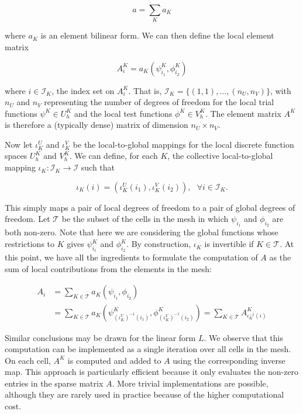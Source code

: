 \begin{equation}
a = \sum_{K} a_K
\end{equation}

where $a_K$ is an element bilinear form. We can then define the local element matrix

\begin{equation}
A_i^K = a_K (\psi_{i_1}^K, \phi_{i_2}^K)
\end{equation}

where $i \in \mathcal{I}_K$, the index set on $A_i^K$. That is, $\mathcal{I}_K = \lbrace (1,1), ..., (n_U, n_V) \rbrace$, with $n_U$ and $n_V$ representing the number of degrees of freedom for the local trial functions $\psi^K \in U_h^K$ and the local test functions $\phi^K \in V_h^K$. The element matrix $A^K$ is therefore a (typically dense) matrix of dimension $n_U \times n_V$.

Now let $\iota_K^U$ and $\iota_K^V$ be the local-to-global mappings for the local discrete function spaces $U_h^K$ and $V_h^K$. We can define, for each $K$, the collective local-to-global mapping $\iota_K : \mathcal{I}_K \rightarrow \mathcal{I}$ such that

\begin{equation}
\iota_K (i) = (\iota_K^U(i_1), \iota_K^V(i_2)),\ \ \ \forall i \in \mathcal{I}_K.
\end{equation}

This simply maps a pair of local degrees of freedom to a pair of global degrees of freedom. Let $\mathcal{T}$ be the subset of the cells in the mesh in which $\psi_{i_1}$ and $\phi_{i_2}$ are both non-zero. Note that here we are considering the global functions whose restrictions to $K$ gives $\psi_{i_1}^K$ and $\phi_{i_2}^K$. By construction, $\iota_K$ is invertible if $K \in \mathcal{T}$. At this point, we have all the ingredients to formulate the computation of $A$ as the sum of local contributions from the elements in the mesh:

\begin{equation}
\begin{split}
A_i & = \sum_{K \in \mathcal{T}} a_K (\psi_{i_1},\phi_{i_2}) \\
& = \sum_{K \in \mathcal{T}} a_K(\psi_{(\iota_K^U)^{-1}(i_1)}^K, \phi_{(\iota_K^V)^{-1}(i_2)}^K) = \sum_{K \in \mathcal{T}} A_{\iota_K^{-1}(i)}^K
\end{split}
\end{equation} 

Similar conclusions may be drawn for the linear form $L$. We observe that this computation can be implemented as a single iteration over all cells in the mesh. On each cell, $A^K$ is computed and added to $A$ using the corresponding inverse map. This approach is particularly efficient because it only evaluates the non-zero entries in the sparse matrix $A$. More trivial implementations are possible, although they are rarely used in practice because of the higher computational cost.

